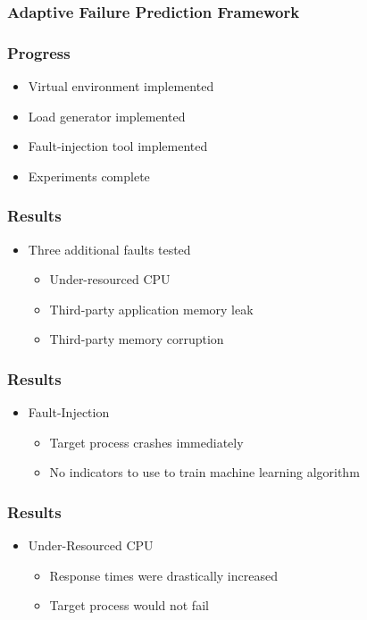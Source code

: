\documentclass[aspectratio=169]{beamer}
\begin{document}
\begin{frame}
  \frametitle{Adaptive Failure Prediction Framework}
\end{frame}


\begin{frame}
  \frametitle{Progress}
  \begin{itemize}
  \item{\textcolor{green}{\checkmark} Virtual environment implemented}
  \item{\textcolor{green}{\checkmark} Load generator implemented}
  \item{\textcolor{green}{\checkmark} Fault-injection tool implemented}
  \item{\textcolor{green}{\checkmark} Experiments complete}
  \end{itemize}
\end{frame}


\begin{frame}
  \frametitle{Results}
  \begin{itemize}
  \item{Three additional faults tested}
    \begin{itemize}
    \item{Under-resourced CPU}
    \item{Third-party application memory leak}
    \item{Third-party memory corruption}
    \end{itemize}
  \end{itemize}
\end{frame}


\begin{frame}
  \frametitle{Results}
  \begin{itemize}
  \item{Fault-Injection}
    \begin{itemize}
    \item{Target process crashes immediately}
    \item{No indicators to use to train machine learning algorithm}
    \end{itemize}
  \end{itemize}
\end{frame}


\begin{frame}
  \frametitle{Results}
  \begin{itemize}
  \item{Under-Resourced CPU}
    \begin{itemize}
    \item{Response times were drastically increased}
    \item{Target process would not fail}
    \end{itemize}
  \end{itemize}
\end{frame}
\end{document}
